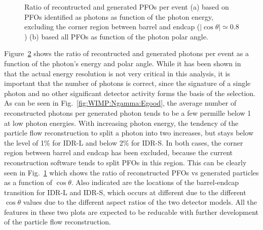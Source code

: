 \begin{figure}[htbp]
\begin{subfigure}{0.49\hsize}
 \caption{  \label{fig:WIMP:NPFO:theta}}
 \end{subfigure}
\caption{Ratio of recontructed and generated PFOs per event 
(a) based on PFOs identified as photons as function of the photon energy, excluding the corner region between barrel and endcap ($|\cos{\theta}|\simeq 0.8$)
(b) based all PFOs as function of the photon polar angle.}

\label{fig:WIMP:Ngamma}
\end{figure}

Figure~\ref{fig:WIMP:Ngamma} shows the ratio of recontructed and generated photons per event as a function of
the photon's energy and polar angle. While it has been shown in~\cite{Habermehl:2018yul} that the actual energy
resolution is not very critical in this analysis, it is important that the number of photons is correct, since the signature of a single photon and no other significant detector activity forms the basis of the selection.
As can be seen in Fig.~\ref{fig:WIMP:Ngamma:Egood}, the average number of reconstructed photons per generated photon tends to be a few permille below 1 at low photon energies. With increasing photon energy, the tendency of the particle flow reconstruction to split a photon into two increases, but stays below the level of 1\% for IDR-L and below 2\% for IDR-S. In both cases, the corner region between barrel and endcap has been excluded, because the current reconstruction software tends to split PFOs in this region. This can be clearly seen in 
Fig.~\ref{fig:WIMP:NPFO:theta} which shows the ratio of reconstructed PFOs vs generated particles as a function of $\cos{\theta}$. Also indicated are the locations of the barrel-endcap transition for IDR-L and IDR-S, which occurs at different  due to the different $\cos{\theta}$ values due to the different aspect ratios of the two detector models.  All the features in these two plots are expected to be reducable with further development of the particle flow reconstruction.

